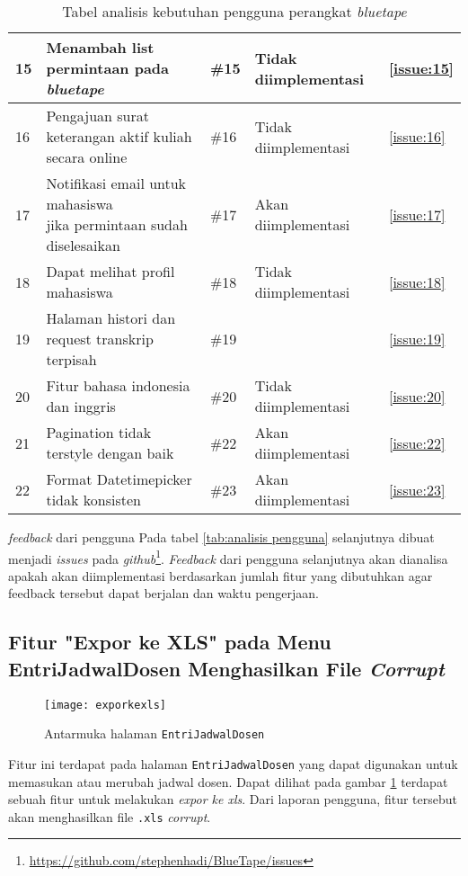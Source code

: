 \begin{table}[H]
{\begin{tabular}{|l|l|l|l|l|}
	15 & Menambah list permintaan pada \textit{bluetape} & \#15 & Tidak diimplementasi & \ref{issue:15} \\ \hline
	16 & Pengajuan surat keterangan aktif kuliah secara online & \#16 & Tidak diimplementasi & \ref{issue:16} \\ \hline
	17 & \makecell[l]{Notifikasi email untuk mahasiswa \\ jika permintaan sudah diselesaikan} & \#17 & Akan diimplementasi &  \ref{issue:17}\\ \hline
	18 & Dapat melihat profil mahasiswa & \#18 & Tidak diimplementasi & \ref{issue:18}\\ \hline
	19 & Halaman histori dan request transkrip terpisah & \#19 & & \ref{issue:19}\\ \hline
	20 & Fitur bahasa indonesia dan inggris & \#20 & Tidak diimplementasi & \ref{issue:20} \\ \hline
	21 & Pagination tidak terstyle dengan baik & \#22 & Akan diimplementasi & \ref{issue:22}\\ \hline
	22 & Format Datetimepicker tidak konsisten &\#23 & Akan diimplementasi & \ref{issue:23}\\ \hline
	
	
	\end{tabular}}
	\caption{Tabel analisis kebutuhan pengguna perangkat \textit{bluetape}}
\end{table}


\textit{feedback} dari pengguna Pada tabel \ref{tab:analisis pengguna} selanjutnya dibuat menjadi \textit{issues} pada \textit{github}\footnote{\url{https://github.com/stephenhadi/BlueTape/issues}}. \textit{Feedback} dari pengguna selanjutnya akan dianalisa apakah akan diimplementasi berdasarkan jumlah fitur yang dibutuhkan agar feedback tersebut dapat berjalan dan waktu pengerjaan.


\subsection{Fitur "Expor ke XLS" pada Menu EntriJadwalDosen Menghasilkan File  \textit{Corrupt}}
\label{issue:1}
\begin{figure}[H]
	\centering
	\texttt{[image: exporkexls]} 
	\caption{Antarmuka halaman \texttt{EntriJadwalDosen}}
	\label{fig:EntriJadwalDosen} 
\end{figure}

Fitur ini terdapat pada halaman \texttt{EntriJadwalDosen} yang dapat digunakan untuk memasukan atau merubah jadwal dosen. Dapat dilihat pada gambar \ref{fig:EntriJadwalDosen} terdapat sebuah fitur untuk melakukan \textit{expor ke xls}. Dari laporan pengguna, fitur tersebut akan menghasilkan file \texttt{.xls} \textit{corrupt}.


